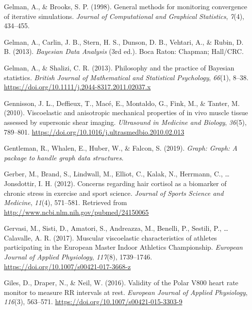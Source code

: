 \documentclass[man,floatsintext]{apa6}
\begin{document}
\leavevmode\hypertarget{ref-Gelman1998}{}%
Gelman, A., \& Brooks, S. P. (1998). General methods for monitoring convergence of iterative simulations. \emph{Journal of Computational and Graphical Statistics}, \emph{7}(4), 434--455.

\leavevmode\hypertarget{ref-Gelman2013}{}%
Gelman, A., Carlin, J. B., Stern, H. S., Dunson, D. B., Vehtari, A., \& Rubin, D. B. (2013). \emph{Bayesian Data Analysis} (3rd ed.). Boca Raton: Chapman; Hall/CRC.

\leavevmode\hypertarget{ref-Gelman2013a}{}%
Gelman, A., \& Shalizi, C. R. (2013). Philosophy and the practice of Bayesian statistics. \emph{British Journal of Mathematical and Statistical Psychology}, \emph{66}(1), 8--38. \url{https://doi.org/10.1111/j.2044-8317.2011.02037.x}

\leavevmode\hypertarget{ref-Gennisson2010}{}%
Gennisson, J. L., Deffieux, T., Macé, E., Montaldo, G., Fink, M., \& Tanter, M. (2010). Viscoelastic and anisotropic mechanical properties of in vivo muscle tissue assessed by supersonic shear imaging. \emph{Ultrasound in Medicine and Biology}, \emph{36}(5), 789--801. \url{https://doi.org/10.1016/j.ultrasmedbio.2010.02.013}

\leavevmode\hypertarget{ref-R-graph}{}%
Gentleman, R., Whalen, E., Huber, W., \& Falcon, S. (2019). \emph{Graph: Graph: A package to handle graph data structures}.

\leavevmode\hypertarget{ref-Gerber2012}{}%
Gerber, M., Brand, S., Lindwall, M., Elliot, C., Kalak, N., Herrmann, C., \ldots{} Jonsdottir, I. H. (2012). Concerns regarding hair cortisol as a biomarker of chronic stress in exercise and sport science. \emph{Journal of Sports Science and Medicine}, \emph{11}(4), 571--581. Retrieved from \url{http://www.ncbi.nlm.nih.gov/pubmed/24150065}

\leavevmode\hypertarget{ref-Gervasi2017}{}%
Gervasi, M., Sisti, D., Amatori, S., Andreazza, M., Benelli, P., Sestili, P., \ldots{} Calavalle, A. R. (2017). Muscular viscoelastic characteristics of athletes participating in the European Master Indoor Athletics Championship. \emph{European Journal of Applied Physiology}, \emph{117}(8), 1739--1746. \url{https://doi.org/10.1007/s00421-017-3668-z}

\leavevmode\hypertarget{ref-Giles2016}{}%
Giles, D., Draper, N., \& Neil, W. (2016). Validity of the Polar V800 heart rate monitor to measure RR intervals at rest. \emph{European Journal of Applied Physiology}, \emph{116}(3), 563--571. \url{https://doi.org/10.1007/s00421-015-3303-9}
\end{document}
